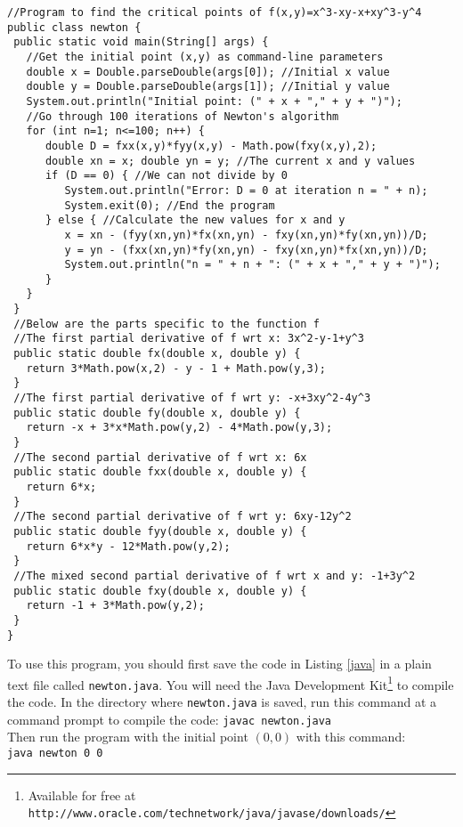 \begin{exmp}
\begin{lstlisting}
//Program to find the critical points of f(x,y)=x^3-xy-x+xy^3-y^4
public class newton {
 public static void main(String[] args) {
   //Get the initial point (x,y) as command-line parameters
   double x = Double.parseDouble(args[0]); //Initial x value
   double y = Double.parseDouble(args[1]); //Initial y value
   System.out.println("Initial point: (" + x + "," + y + ")");
   //Go through 100 iterations of Newton's algorithm
   for (int n=1; n<=100; n++) {
      double D = fxx(x,y)*fyy(x,y) - Math.pow(fxy(x,y),2);
      double xn = x; double yn = y; //The current x and y values
      if (D == 0) { //We can not divide by 0
         System.out.println("Error: D = 0 at iteration n = " + n);
         System.exit(0); //End the program
      } else { //Calculate the new values for x and y
         x = xn - (fyy(xn,yn)*fx(xn,yn) - fxy(xn,yn)*fy(xn,yn))/D;
         y = yn - (fxx(xn,yn)*fy(xn,yn) - fxy(xn,yn)*fx(xn,yn))/D;
         System.out.println("n = " + n + ": (" + x + "," + y + ")");
      }
   }
 }
 //Below are the parts specific to the function f
 //The first partial derivative of f wrt x: 3x^2-y-1+y^3
 public static double fx(double x, double y) {
   return 3*Math.pow(x,2) - y - 1 + Math.pow(y,3);
 }
 //The first partial derivative of f wrt y: -x+3xy^2-4y^3
 public static double fy(double x, double y) {
   return -x + 3*x*Math.pow(y,2) - 4*Math.pow(y,3);
 }
 //The second partial derivative of f wrt x: 6x
 public static double fxx(double x, double y) {
   return 6*x;
 }
 //The second partial derivative of f wrt y: 6xy-12y^2
 public static double fyy(double x, double y) {
   return 6*x*y - 12*Math.pow(y,2);
 }
 //The mixed second partial derivative of f wrt x and y: -1+3y^2
 public static double fxy(double x, double y) {
   return -1 + 3*Math.pow(y,2);
 }
}
\end{lstlisting}
\newpage
To use this program, you should first save the code in Listing \ref{java} in a plain text file called
\texttt{newton.java}. You will need the Java Development Kit\footnote{Available for free at
\texttt{http://www.oracle.com/technetwork/java/javase/downloads/}} to compile the code. In the directory where \texttt{newton.java} is
saved, run this command at a command prompt to compile the code: \texttt{javac newton.java}\\
Then run the program with the initial point $(0,0)$ with this command:\\\texttt{java newton 0 0}


\end{exmp}
